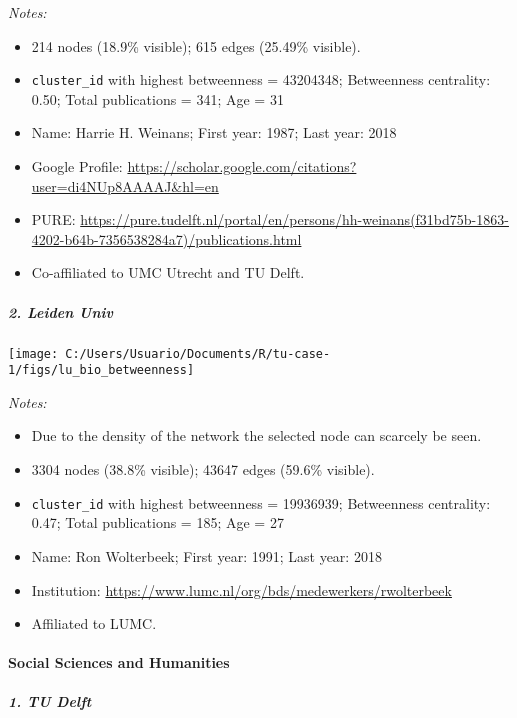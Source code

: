 \documentclass[]{article}
\providecommand{\tightlist}{%
  \setlength{\itemsep}{0pt}\setlength{\parskip}{0pt}}
\let\oldparagraph\paragraph
\renewcommand{\paragraph}[1]{\oldparagraph{#1}\mbox{}}
\let\oldsubparagraph\subparagraph
\renewcommand{\subparagraph}[1]{\oldsubparagraph{#1}\mbox{}}
\begin{document}
\emph{Notes:}

\begin{itemize}
\tightlist
\item
  214 nodes (18.9\% visible); 615 edges (25.49\% visible).
\item
  \texttt{cluster\_id} with highest betweenness = 43204348; Betweenness
  centrality: 0.50; Total publications = 341; Age = 31
\item
  Name: Harrie H. Weinans; First year: 1987; Last year: 2018
\item
  Google Profile:
  \url{https://scholar.google.com/citations?user=di4NUp8AAAAJ\&hl=en}
\item
  PURE:
  \url{https://pure.tudelft.nl/portal/en/persons/hh-weinans(f31bd75b-1863-4202-b64b-7356538284a7)/publications.html}
\item
  Co-affiliated to UMC Utrecht and TU Delft.
\end{itemize}

\hypertarget{leiden-univ-1}{%
\subparagraph{2. Leiden Univ}\label{leiden-univ-1}}

\texttt{[image: C:/Users/Usuario/Documents/R/tu-case-1/figs/lu\_bio\_betweenness]}

\emph{Notes:}

\begin{itemize}
\tightlist
\item
  Due to the density of the network the selected node can scarcely be
  seen.
\item
  3304 nodes (38.8\% visible); 43647 edges (59.6\% visible).
\item
  \texttt{cluster\_id} with highest betweenness = 19936939; Betweenness
  centrality: 0.47; Total publications = 185; Age = 27
\item
  Name: Ron Wolterbeek; First year: 1991; Last year: 2018
\item
  Institution: \url{https://www.lumc.nl/org/bds/medewerkers/rwolterbeek}
\item
  Affiliated to LUMC.
\end{itemize}

\hypertarget{social-sciences-and-humanities}{%
\paragraph{Social Sciences and
Humanities}\label{social-sciences-and-humanities}}

\hypertarget{tu-delft-2}{%
\subparagraph{1. TU Delft}\label{tu-delft-2}}
\end{document}
